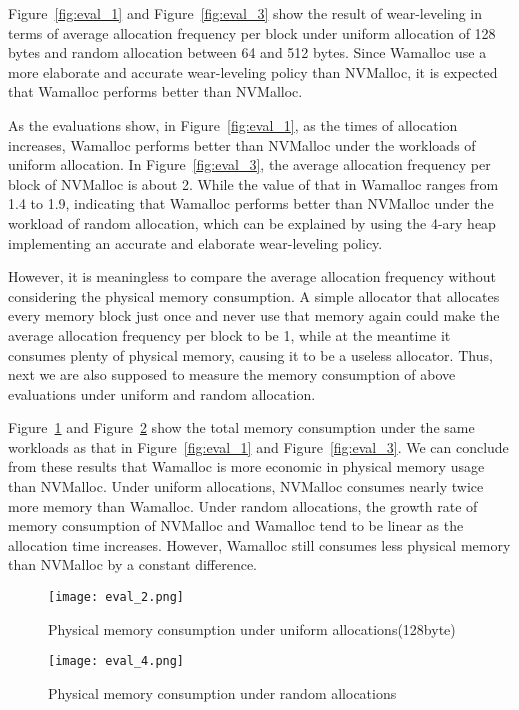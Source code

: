 \documentclass[10pt, conference, compsocconf]{IEEEtran}
\begin{document}
Figure~\ref{fig:eval_1} and Figure~\ref{fig:eval_3} show the result of wear-leveling 
in terms of average allocation frequency per block
under uniform allocation of 128 bytes and random allocation between 64 and 512 bytes.
Since Wamalloc use a more elaborate and accurate wear-leveling policy than NVMalloc,
it is expected that Wamalloc performs better than NVMalloc.

As the evaluations show, in Figure~\ref{fig:eval_1}, as the times of allocation increases,
Wamalloc performs better than NVMalloc under the workloads of uniform allocation.
In Figure~\ref{fig:eval_3},
the average allocation frequency per block of NVMalloc is about 2.
While the value of that in Wamalloc ranges from 1.4 to 1.9, 
indicating that Wamalloc performs better than NVMalloc under the workload of random allocation,
which can be explained by using the 4-ary heap implementing an accurate and elaborate wear-leveling policy.

However, it is meaningless to compare the average allocation frequency without considering the physical memory consumption.
A simple allocator that allocates every memory block just once and never use that memory again 
could make the average allocation frequency per block to be 1, 
while at the meantime it consumes plenty of physical memory, causing it to be a useless allocator.
Thus, next we are also supposed to measure the memory consumption of above evaluations under uniform and random allocation.

Figure~\ref{fig:eval_2} and Figure~\ref{fig:eval_4} show the total memory consumption under the same workloads 
as that in Figure~\ref{fig:eval_1} and Figure~\ref{fig:eval_3}.
We can conclude from these results that 
Wamalloc is more economic in physical memory usage than NVMalloc.
Under uniform allocations, NVMalloc consumes nearly twice more memory than Wamalloc.
Under random allocations, the growth rate of memory consumption of NVMalloc and Wamalloc tend to be linear 
as the allocation time increases. 
However, Wamalloc still consumes less physical memory than NVMalloc by a constant difference.

\begin{figure}[t]
\centering
\texttt{[image: eval\_2.png]}
\caption{Physical memory consumption under uniform allocations(128byte)}
\label{fig:eval_2}
\end{figure}

\begin{figure}[t]
\centering
\texttt{[image: eval\_4.png]}
\caption{Physical memory consumption under random allocations}
\label{fig:eval_4}
\end{figure}
\end{document}
